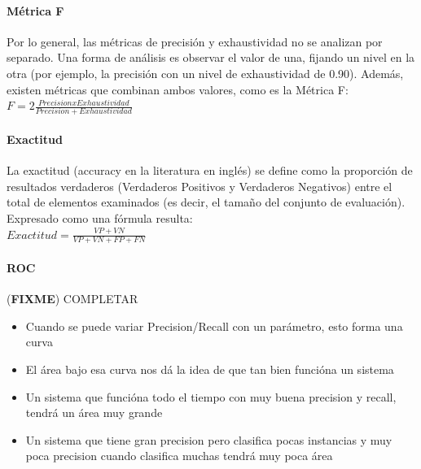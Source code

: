 \documentclass[a4paper,11pt,spanish]{book}
\newcommand*{\FIXME}[1]{{(\textbf{FIXME}) {#1}}}
\begin{document}
	  \paragraph { Métrica F }
	    Por lo general, las métricas de precisión y exhaustividad no se analizan por separado. Una forma de análisis es observar el valor de una, fijando un nivel en la otra 
	    (por ejemplo, la precisión con un nivel de exhaustividad de 0.90). Además, existen métricas que combinan ambos valores, como es la Métrica F:\\
	    $ F = 2 {\frac {Precision x Exhaustividad}{Precision + Exhaustividad}}$\\
	  
	  \paragraph { Exactitud }
	    La exactitud (accuracy en la literatura en inglés) se define como la proporción de resultados verdaderos (Verdaderos Positivos y Verdaderos Negativos) entre el total 
	    de elementos examinados (es decir, el tamaño del conjunto de evaluación). Expresado como una fórmula resulta:\\
	    $ Exactitud = {\frac {VP+VN}{VP+VN+FP+FN}}$

	  \paragraph {ROC}
	    \FIXME{COMPLETAR}
	    \begin{itemize}
	      \item Cuando se puede variar Precision/Recall con un parámetro, esto forma una curva
	      \item El área bajo esa curva nos dá la idea de que tan bien funcióna un sistema
	      \item Un sistema que funcióna todo el tiempo con muy buena precision y recall, tendrá un área muy grande
	      \item Un sistema que tiene gran precision pero clasifica pocas instancias y muy poca precision cuando clasifica muchas tendrá muy poca área
	    \end{itemize}
\end{document}
